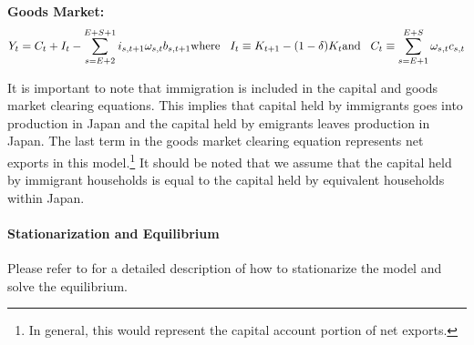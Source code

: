 \documentclass[10pt]{article}
\renewcommand{\thesection}{\arabic{section}}
\renewcommand{\thesubsection}{\thesection.\arabic{subsection}}
\renewcommand{\thesubsubsection}{\thesubsection.\arabic{subsubsection}}
\renewcommand{\subsubsection}[2][]{\oldsubsubsection[#1]{#2}\index{#1}\label{sec:\thesubsubsection}}
\numberwithin{equation}{subsection}
\begin{document}
\begin{appendices}
\textbf{Goods Market:}
\begin{dmath}
   Y_t = C_t + I_t - \sum_{s=E+2}^{E+S+1}i_{s,t+1}\omega_{s,t}b_{s,t+1} \\
   {\text{where} \hspace{3mm} I_t \equiv K_{t+1} - (1-\delta)K_t} \\
   {\text{and} \hspace{3mm} C_t \equiv \sum_{s=E+1}^{E+S}\omega_{s,t}c_{s,t}}
\end{dmath}

\par It is important to note that immigration is included in the capital and goods market clearing equations. This implies that capital held by immigrants goes into production in Japan and the capital held by emigrants leaves production in Japan. The last term in the goods market clearing equation represents net exports in this model.\footnote{In general, this would represent the capital account portion of net exports.} It should be noted that we assume that the capital held by immigrant households is equal to the capital held by equivalent households within Japan.


\paragraph{Stationarization and Equilibrium}

\par Please refer to \cite{E2020} for a detailed description of how to stationarize the model and solve the equilibrium.


\subsubsection{Demographics}


\end{appendices}
\end{document}
